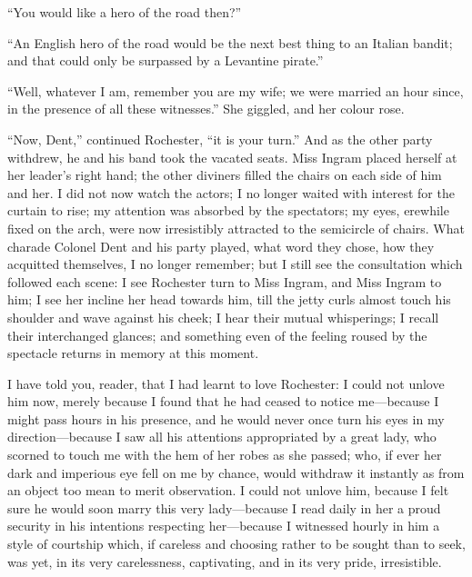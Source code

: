 \enquote{You would like a hero of the road then?}

\enquote{An English hero of the road would be the next best thing to an
Italian bandit; and that could only be surpassed by a Levantine pirate.}

\enquote{Well, whatever I am, remember you are my wife; we were married
an hour since, in the presence of all these witnesses.} She giggled,
and her colour rose.

\enquote{Now, Dent,} continued \Mr{} Rochester, \enquote{it is your
turn.} And as the other party withdrew, he and his band took the
vacated seats. Miss Ingram placed herself at her leader's right hand;
the other diviners filled the chairs on each side of him and her. I did
not now watch the actors; I no longer waited with interest for the
curtain to rise; my attention was absorbed by the spectators; my eyes,
erewhile fixed on the arch, were now irresistibly attracted to the
semicircle of chairs. What charade Colonel Dent and his party played,
what word they chose, how they acquitted themselves, I no longer
remember; but I still see the consultation which followed each scene: I
see \Mr{} Rochester turn to Miss Ingram, and Miss Ingram to him; I see her
incline her head towards him, till the jetty curls almost touch his
shoulder and wave against his cheek; I hear their mutual whisperings; I
recall their interchanged glances; and something even of the feeling
roused by the spectacle returns in memory at this moment.

I have told you, reader, that I had learnt to love \Mr{} Rochester: I
could not unlove him now, merely because I found that he had ceased to
notice me---because I might pass hours in his presence, and he would
never once turn his eyes in my direction---because I saw all his
attentions appropriated by a great lady, who scorned to touch me with
the hem of her robes as she passed; who, if ever her dark and imperious
eye fell on me by chance, would withdraw it instantly as from an object
too mean to merit observation. I could not unlove him, because I felt
sure he would soon marry this very lady---because I read daily in her a
proud security in his intentions respecting her---because I witnessed
hourly in him a style of courtship which, if careless and choosing
rather to be sought than to seek, was yet, in its very carelessness,
captivating, and in its very pride, irresistible.

